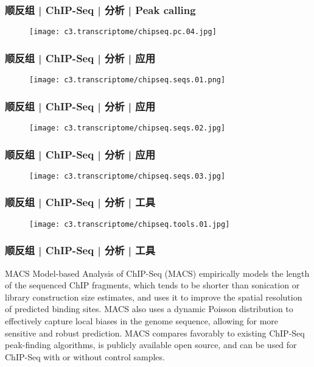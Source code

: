 \begin{frame}
  \frametitle{顺反组 | ChIP-Seq | 分析 | Peak calling}
  \begin{figure}
    \centering
    \texttt{[image: c3.transcriptome/chipseq.pc.04.jpg]}
  \end{figure}
\end{frame}

\begin{frame}
  \frametitle{顺反组 | ChIP-Seq | 分析 | 应用}
  \begin{figure}
    \centering
    \texttt{[image: c3.transcriptome/chipseq.seqs.01.png]}
  \end{figure}
\end{frame}

\begin{frame}
  \frametitle{顺反组 | ChIP-Seq | 分析 | 应用}
  \begin{figure}
    \centering
    \texttt{[image: c3.transcriptome/chipseq.seqs.02.jpg]}
  \end{figure}
\end{frame}

\begin{frame}
  \frametitle{顺反组 | ChIP-Seq | 分析 | 应用}
  \begin{figure}
    \centering
    \texttt{[image: c3.transcriptome/chipseq.seqs.03.jpg]}
  \end{figure}
\end{frame}

\begin{frame}
  \frametitle{顺反组 | ChIP-Seq | 分析 | 工具}
  \begin{figure}
    \centering
    \texttt{[image: c3.transcriptome/chipseq.tools.01.jpg]}
  \end{figure}
\end{frame}

\begin{frame}
  \frametitle{顺反组 | ChIP-Seq | 分析 | 工具}
  \begin{block}{MACS}
    Model-based Analysis of ChIP-Seq (MACS) empirically models the length of the sequenced ChIP fragments, which tends to be shorter than sonication or library construction size estimates, and uses it to improve the spatial resolution of predicted binding sites. MACS also uses a dynamic Poisson distribution to effectively capture local biases in the genome sequence, allowing for more sensitive and robust prediction. MACS compares favorably to existing ChIP-Seq peak-finding algorithms, is publicly available open source, and can be used for ChIP-Seq with or without control samples.
  \end{block}
\end{frame}

